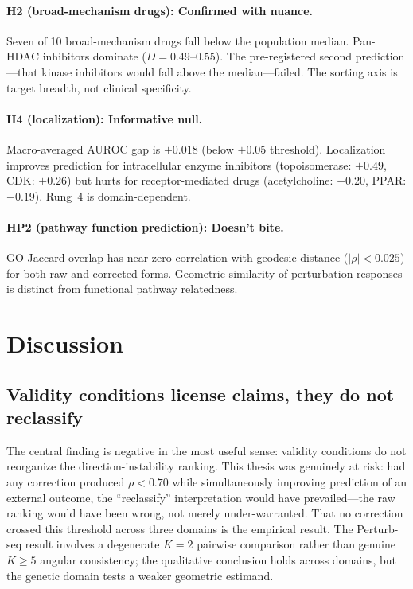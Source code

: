 \documentclass{article}
\begin{document}
\paragraph{H2 (broad-mechanism drugs): Confirmed with nuance.}
Seven of 10 broad-mechanism drugs fall below the population median.
Pan-HDAC inhibitors dominate ($D = 0.49$--$0.55$). The pre-registered
second prediction---that kinase inhibitors would fall above the
median---failed. The sorting axis is target breadth, not clinical
specificity.

\paragraph{H4 (localization): Informative null.}
Macro-averaged AUROC gap is $+0.018$ (below $+0.05$ threshold). Localization
improves prediction for intracellular enzyme inhibitors (topoisomerase:
$+0.49$, CDK: $+0.26$) but hurts for receptor-mediated drugs
(acetylcholine: $-0.20$, PPAR: $-0.19$). Rung~4 is domain-dependent.

\paragraph{HP2 (pathway function prediction): Doesn't bite.}
GO Jaccard overlap has near-zero correlation with geodesic distance
($|\rho| < 0.025$) for both raw and corrected forms. Geometric similarity
of perturbation responses is distinct from functional pathway relatedness.

\section{Discussion}

\subsection{Validity conditions license claims, they do not reclassify}

The central finding is negative in the most useful sense: validity conditions
do not reorganize the direction-instability ranking. This thesis was
genuinely at risk: had any correction produced $\rho < 0.70$ while
simultaneously improving prediction of an external outcome, the
``reclassify'' interpretation would have prevailed---the raw ranking
would have been wrong, not merely under-warranted. That no correction
crossed this threshold across three domains is the empirical result.
The Perturb-seq result involves a degenerate $K = 2$ pairwise comparison
rather than genuine $K \geq 5$ angular consistency; the qualitative
conclusion holds across domains, but the genetic domain tests a weaker
geometric estimand.
\end{document}
